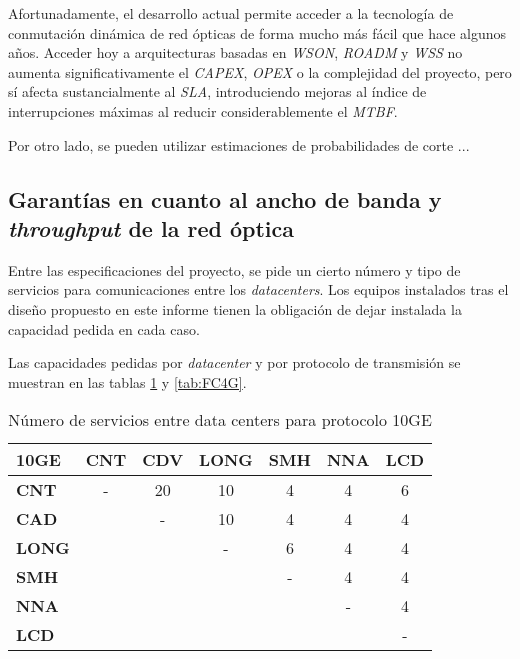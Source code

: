 Afortunadamente, el desarrollo actual permite acceder a la tecnología 
de conmutación dinámica de red ópticas de forma mucho más fácil
que hace algunos años. Acceder hoy a arquitecturas basadas en
\emph{WSON}, \emph{ROADM} y \emph{WSS} no aumenta significativamente el 
\emph{CAPEX}, \emph{OPEX} o la complejidad del proyecto, pero sí afecta 
sustancialmente al \emph{SLA}, introduciendo mejoras al índice de 
interrupciones máximas al reducir considerablemente el \emph{MTBF}.

Por otro lado, se pueden utilizar estimaciones de probabilidades de corte ...

\subsection{Garantías en cuanto al ancho de banda y \emph{throughput}
  de la red óptica}
\label{sec:anchodebanda}

Entre las especificaciones del proyecto, se pide un cierto número y
tipo de servicios para comunicaciones entre los \emph{datacenters}. Los
equipos instalados tras el diseño propuesto en este informe tienen la
obligación de dejar instalada la capacidad pedida en cada caso.

Las capacidades pedidas por \emph{datacenter} y por protocolo de
transmisión se muestran en las tablas \ref{tab:10ge} y \ref{tab:FC4G}.

\begin{table}[H]
  \centering
  \begin{tabular}{| l | c | c | c | c | c | c |}
    \hline
    \textbf{10GE} & \textbf{CNT} & \textbf{CDV} & \textbf{LONG} & \textbf{SMH} & \textbf{NNA} & \textbf{LCD} \\
    \hline
    \textbf{CNT}  & - & 20 & 10 & 4 & 4 & 6 \\
    \hline
    \textbf{CAD}  &   & - & 10 & 4 & 4 & 4 \\
    \hline
    \textbf{LONG} &   &   & - & 6 & 4 & 4 \\
    \hline
    \textbf{SMH}  &   &   &   & - & 4 & 4 \\
    \hline
    \textbf{NNA}  &   &   &   &   & - & 4 \\
    \hline
    \textbf{LCD}  &   &   &   &   &   & - \\
    \hline
  \end{tabular}
  \caption{Número de servicios entre data centers para protocolo 10GE}
  \label{tab:10ge}
\end{table}

